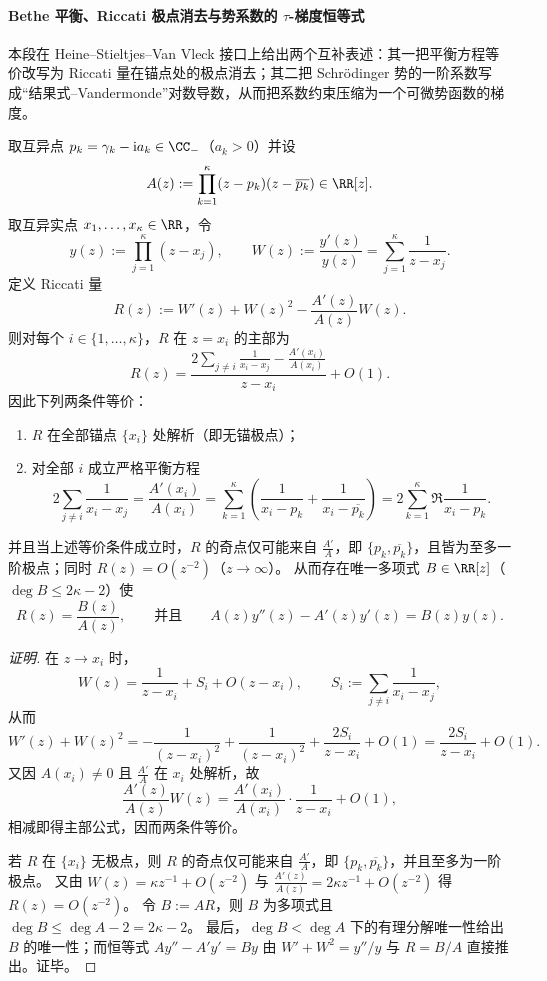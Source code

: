 
\paragraph{Bethe 平衡、Riccati 极点消去与势系数的 \texorpdfstring{$\tau$}{tau}-梯度恒等式}
本段在 Heine--Stieltjes--Van Vleck 接口上给出两个互补表述：其一把平衡方程等价改写为 Riccati 量在锚点处的极点消去；其二把 Schr\"odinger 势的一阶系数写成“结果式--Vandermonde”对数导数，从而把系数约束压缩为一个可微势函数的梯度。

\begin{conclusion}\label{con:xi-terminal-riccati-pole-cancellation-bethe-equilibrium}
取互异点 \(p_k=\gamma_k-\mathrm{i}a_k\in\CC_{-}\)（\(a_k>0\)）并设
\[
A(z):=\prod_{k=1}^{\kappa}(z-p_k)(z-\overline{p_k})\in\RR[z].
\]
取互异实点 \(x_1,\dots,x_\kappa\in\RR\)，令
\[
y(z):=\prod_{j=1}^{\kappa}(z-x_j),\qquad
W(z):=\frac{y'(z)}{y(z)}=\sum_{j=1}^{\kappa}\frac{1}{z-x_j}.
\]
定义 Riccati 量
\[
R(z):=W'(z)+W(z)^2-\frac{A'(z)}{A(z)}W(z).
\]
则对每个 \(i\in\{1,\dots,\kappa\}\)，\(R\) 在 \(z=x_i\) 的主部为
\[
R(z)=\frac{2\sum_{j\ne i}\frac{1}{x_i-x_j}-\frac{A'(x_i)}{A(x_i)}}{z-x_i}+O(1).
\]
因此下列两条件等价：
\begin{enumerate}
  \item \(R\) 在全部锚点 \(\{x_i\}\) 处解析（即无锚极点）；
  \item 对全部 \(i\) 成立严格平衡方程
  \[
  2\sum_{j\ne i}\frac{1}{x_i-x_j}
  =\frac{A'(x_i)}{A(x_i)}
  =\sum_{k=1}^{\kappa}\left(\frac{1}{x_i-p_k}+\frac{1}{x_i-\overline{p_k}}\right)
  =2\sum_{k=1}^{\kappa}\Re\frac{1}{x_i-p_k}.
  \]
\end{enumerate}
并且当上述等价条件成立时，\(R\) 的奇点仅可能来自 \(\frac{A'}{A}\)，即 \(\{p_k,\overline{p_k}\}\)，且皆为至多一阶极点；同时 \(R(z)=O(z^{-2})\)（\(z\to\infty\)）。
从而存在唯一多项式 \(B\in\RR[z]\)（\(\deg B\le 2\kappa-2\)）使
\[
R(z)=\frac{B(z)}{A(z)},
\qquad\text{并且}\qquad
A(z)y''(z)-A'(z)y'(z)=B(z)y(z).
\]
\end{conclusion}
\begin{proof}[证明]
在 \(z\to x_i\) 时，
\[
W(z)=\frac{1}{z-x_i}+S_i+O(z-x_i),\qquad S_i:=\sum_{j\ne i}\frac{1}{x_i-x_j},
\]
从而
\[
W'(z)+W(z)^2
=-\frac{1}{(z-x_i)^2}+\frac{1}{(z-x_i)^2}+\frac{2S_i}{z-x_i}+O(1)
=\frac{2S_i}{z-x_i}+O(1).
\]
又因 \(A(x_i)\neq 0\) 且 \(\frac{A'}{A}\) 在 \(x_i\) 处解析，故
\[
\frac{A'(z)}{A(z)}W(z)=\frac{A'(x_i)}{A(x_i)}\cdot\frac{1}{z-x_i}+O(1),
\]
相减即得主部公式，因而两条件等价。
\par
若 \(R\) 在 \(\{x_i\}\) 无极点，则 \(R\) 的奇点仅可能来自 \(\frac{A'}{A}\)，即 \(\{p_k,\overline{p_k}\}\)，并且至多为一阶极点。
又由
\(
W(z)=\kappa z^{-1}+O(z^{-2})
\)
与
\(
\frac{A'(z)}{A(z)}=2\kappa z^{-1}+O(z^{-2})
\)
得 \(R(z)=O(z^{-2})\)。
令 \(B:=AR\)，则 \(B\) 为多项式且 \(\deg B\le \deg A-2=2\kappa-2\)。
最后，\(\deg B<\deg A\) 下的有理分解唯一性给出 \(B\) 的唯一性；而恒等式
\(
A y''-A'y'=By
\)
由
\(
W'+W^2=y''/y
\)
与 \(R=B/A\) 直接推出。证毕。
\end{proof}

